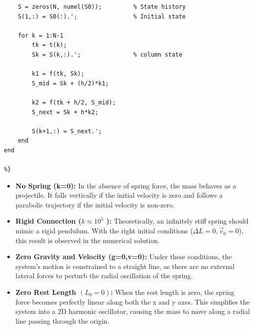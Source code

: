 \documentclass{article}
\begin{document}
\begin{lstlisting}
    S = zeros(N, numel(S0));         % State history
    S(1,:) = S0(:).';                % Initial state

    for k = 1:N-1
        tk = t(k);
        Sk = S(k,:).';               % column state

        k1 = f(tk, Sk);
        S_mid = Sk + (h/2)*k1;

        k2 = f(tk + h/2, S_mid);
        S_next = Sk + h*k2;

        S(k+1,:) = S_next.';
    end
end

%}

\end{lstlisting}


\begin{itemize}
\item \textbf{No Spring (k=0):} In the absence of spring force, the mass behaves as a projectile. It falls vertically if the initial velocity is zero and follows a parabolic trajectory if the initial velocity is non-zero.
\item \textbf{Rigid Connection ($k\approx 10^5$ ):} Theoretically, an infinitely stiff spring should mimic a rigid pendulum. With the right initial conditions ($\Delta L = 0, \vec{v}_0 = 0$), this result is observed in the numerical solution.
\item \textbf{Zero Gravity and Velocity (g=0,v=0):} Under these conditions, the system's motion is constrained to a straight line, as there are no external lateral forces to perturb the radial oscillation of the spring.
\item \textbf{Zero Rest Length $(L_0 = 0)$:} When the rest length is zero, the spring force becomes perfectly linear along both the x and y axes. This simplifies the system into a 2D harmonic oscillator, causing the mass to move along a radial line passing through the origin.
\end{itemize}
\end{document}
